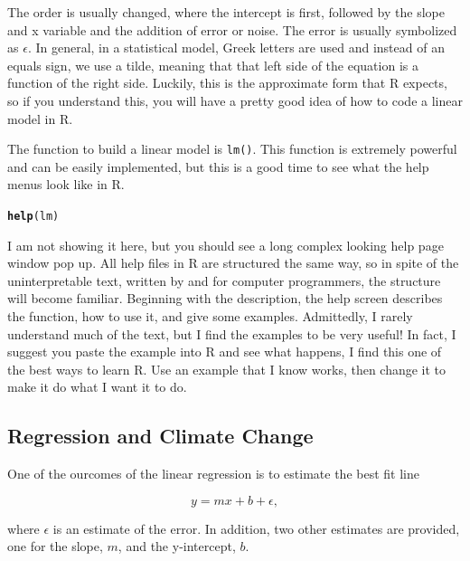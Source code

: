 \documentclass{article}\usepackage[]{graphicx}\usepackage[]{color}
\makeatletter
\newcommand{\hlstd}[1]{\textcolor[rgb]{0.345,0.345,0.345}{#1}}%
\newcommand{\hlkwd}[1]{\textcolor[rgb]{0.737,0.353,0.396}{\textbf{#1}}}%
\newenvironment{kframe}{%
 \def\at@end@of@kframe{}%
 \ifinner\ifhmode%
  \def\at@end@of@kframe{\end{minipage}}%
  \begin{minipage}{\columnwidth}%
 \fi\fi%
 \def\FrameCommand##1{\hskip\@totalleftmargin \hskip-\fboxsep
 \colorbox{shadecolor}{##1}\hskip-\fboxsep
     \hskip-\linewidth \hskip-\@totalleftmargin \hskip\columnwidth}%
 \MakeFramed {\advance\hsize-\width
   \@totalleftmargin\z@ \linewidth\hsize
   \@setminipage}}%
 {\par\unskip\endMakeFramed%
 \at@end@of@kframe}
\newenvironment{knitrout}{}{} %
\makeatother
\begin{document}
The order is usually changed, where the intercept is first, followed by the slope and x variable and the addition of error or noise. The error is usually symbolized as $\epsilon$. In general, in a statistical model, Greek letters are used and instead of an equals sign, we use a tilde, meaning that that left side of the equation is a function of the right side. Luckily, this is the approximate form that R expects, so if you understand this, you will have a pretty good idea of how to code a linear model in R. 

The function to build a linear model is \texttt{lm()}. This function is extremely powerful and can be easily implemented, but this is a good time to see what the help menus look like in R. 

\begin{knitrout}
\color{fgcolor}\begin{kframe}
\begin{alltt}
\hlkwd{help}\hlstd{(lm)}
\end{alltt}
\end{kframe}
\end{knitrout}

I am not showing it here, but you should see a long complex looking help page window pop up. All help files in R are structured the same way, so in spite of the uninterpretable text, written by and for computer programmers, the structure will become familiar. Beginning with the description, the help screen describes the function, how to use it, and give some examples. Admittedly, I rarely understand much of the text, but I find the examples to be very useful! In fact, I suggest you paste the example into R and see what happens, I find this one of the best ways to learn R. Use an example that I know works, then change it to make it do what I want it to do.

\subsection{Regression and Climate Change}

One of the ourcomes of the linear regression is to estimate the best fit line

\begin{equation}
y = mx + b + \epsilon,
\end{equation}

where $\epsilon$ is an estimate of the error. In addition, two other estimates are provided, one for the slope, $m$, and the y-intercept, $b$. 
\end{document}
